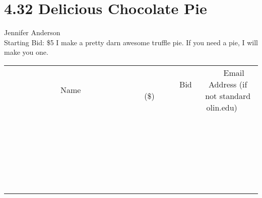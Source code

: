 \documentclass[11pt]{article}
\begin{document}
\section*{4.32 Delicious Chocolate Pie}
Jennifer Anderson
\\
Starting Bid: \$5
\newline
I make a pretty darn awesome truffle pie. If you need a pie, I will make you one.
\\[6ex]
\begin{tabular}{c c c}
~~~~~~~~~~~~~Name~~~~~~~~~~~~~ & ~~~~~~~~~Bid (\$)~~~~~~~~~  & ~~~Email Address (if not standard olin.edu)~~~\\
 & & \\
\hline
 & & \\
\hline
 & & \\
\hline
 & & \\
\hline
 & & \\
\hline
 & & \\
\hline
 & & \\
\hline
 & & \\
\hline
 & & \\
\hline
 & & \\
\hline
 & & \\
\hline
 & & \\
\hline
 & & \\
\hline
 & & \\
\hline
 & & \\
\hline
 & & \\
\hline
 & & \\
\hline
 & & \\
\hline
 & & \\
\hline
 & & \\
\hline
 & & \\
\hline
 & & \\
\hline
 & & \\
\hline
 & & \\
\hline
 & & \\
\hline
 & & \\
\hline
\end{tabular}
\newpage
\end{document}
